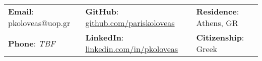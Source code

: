 %
\vspace{0.2cm} 
\begin{center}
    \begin{tabular}{lll}
        \textbf{Email}: pkoloveas@uop.gr      &
        \hspace{0.55in} \textbf{GitHub}: \href{https://github.com/pariskoloveas}{github.com/pariskoloveas}   & 
        \hspace{0.4in} 	\textbf{Residence}: Athens, GR \\

        \textbf{Phone}: \textit{\color{darkgray}TBF}   & 
        \hspace{0.55in} \textbf{LinkedIn}: \href{https://www.linkedin.com/in/pkoloveas/}{linkedin.com/in/pkoloveas}    &
        \hspace{0.4in} \textbf{Citizenship}: Greek 
    \end{tabular}
\end{center}